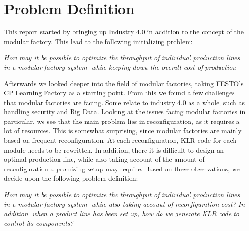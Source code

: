 \section{Problem Definition}\label{ch:problemdefinition}
This report started by bringing up Industry 4.0 in addition to the concept of the modular factory. This lead to the following initializing problem:

\bigskip
\textit{How may it be possible to optimize the throughput of individual production lines in a modular factory system, while keeping down the overall cost of production}
\bigskip

Afterwards we looked deeper into the field of modular factories, taking FESTO's CP Learning Factory as a starting point. From this we found a few challenges that modular factories are facing. Some relate to industry 4.0 as a whole, such as handling security and Big Data. Looking at the issues facing modular factories in particular, we see that the main problem lies in reconfiguration, as it requires a lot of resources. This is somewhat surprising, since modular factories are mainly based on frequent reconfiguration. At each reconfiguration, KLR code for each module needs to be rewritten. In addition, there it is difficult to design an optimal production line, while also taking account of the amount of reconfiguration a promising setup may require. Based on these observations, we decide upon the following problem definition:     

\bigskip
\textit{How may it be possible to optimize the throughput of individual production lines in a modular factory system, while also taking account of reconfiguration cost? In addition, when a product line has been set up, how do we generate KLR code to control its components?}
\bigskip





